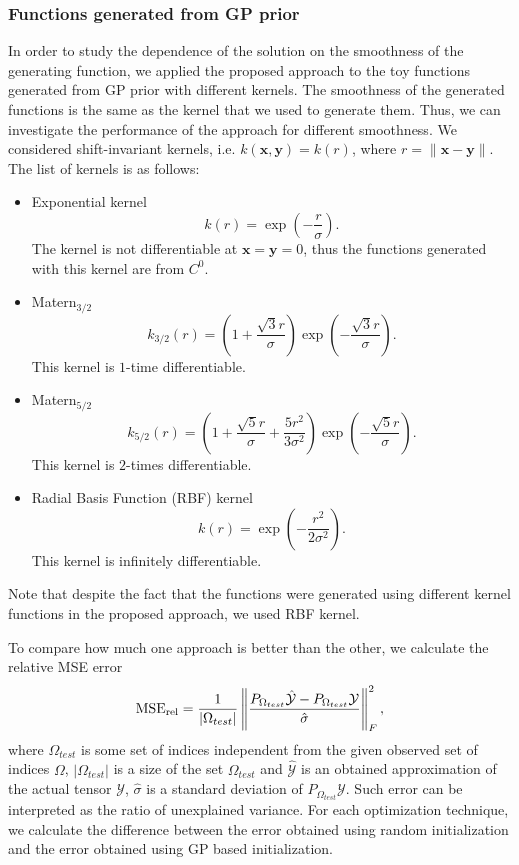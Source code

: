 \subsubsection{Functions generated from GP prior}
In order to study the dependence of the solution on the smoothness of the generating function, we applied the proposed approach to the toy functions generated from GP prior with different kernels.
The smoothness of the generated functions is the same as the kernel that we used to generate them.
Thus, we can investigate the performance of the approach for different smoothness.
We considered shift-invariant kernels, i.e. $k(\mathbf{x}, \mathbf{y}) = k(r)$, where $r = \|\mathbf{x} - \mathbf{y}\|$.
The list of kernels is as follows:
\begin{itemize}
    \item Exponential kernel
    \[
        k(r) = \exp \left ( -\frac{r}{\sigma} \right ).
    \]
    The kernel is not differentiable at $\mathbf{x} = \mathbf{y} = 0$, thus
    the functions generated with this kernel are from $C^0$.
    \item Matern$_{3/2}$
    \[
        k_{3/2}(r) = \left (1 + \frac{\sqrt{3}r}{\sigma} \right )
        \exp \left ( -\frac{\sqrt{3}r}{\sigma} \right).
    \]
    This kernel is $1$-time differentiable.
    \item Matern$_{5/2}$
    \[
        k_{5/2}(r) = \left (1 + \frac{\sqrt{5}r}{\sigma} + \frac{5r^2}{3\sigma^2}\right )
        \exp \left ( -\frac{\sqrt{5}r}{\sigma} \right).
    \]
    This kernel is $2$-times differentiable.
    \item Radial Basis Function (RBF) kernel
    \[
        k(r) = \exp \left ( -\frac{r^2}{2\sigma^2} \right ).
    \]
    This kernel is infinitely differentiable.

\end{itemize}
Note that despite the fact that the functions were generated using different kernel functions
in the proposed approach, we used RBF kernel.

To compare how much one approach is better than the other, we calculate the relative MSE error
\[
    {\rm MSE_{rel}} = \frac{1}{\lvert \Omega_{test}\rvert} \left \|\frac{P_{\Omega_{test}}\hat{\mathcal{Y}} -
      P_{\Omega_{test}}\mathcal{Y}}
      {\hat{\sigma}}\right \|_F^2,
\]
where $\Omega_{test}$ is some set of indices independent from the given observed set of indices $\Omega$, $|\Omega_{test}|$ is a size of the set $\Omega_{test}$ and $\widehat{\mathcal{Y}}$ is an obtained approximation of the actual tensor $\mathcal{Y}$,
$\hat{\sigma}$ is a standard deviation of $P_{\Omega_{test}}\mathcal{Y}$.
Such error can be interpreted as the ratio of unexplained variance.
For each optimization technique, we calculate the difference between the error obtained using random initialization and the error obtained using GP based initialization.

